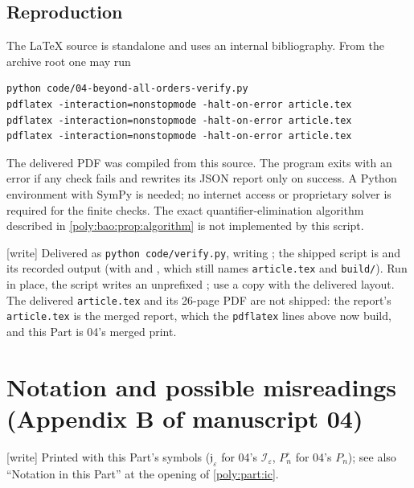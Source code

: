 \documentclass[11pt,a4paper]{article}
\numberwithin{equation}{section}
\theoremstyle{plain}
\newcommand{\wtag}{\textup{[write]}}%
\newcommand{\eps}{\varepsilon}
\newcommand{\JJ}{\mathfrak j}
\begin{document}
\subsection{Reproduction}
The LaTeX source is standalone and uses an internal bibliography. From
the archive root one may run
\begin{verbatim}
python code/04-beyond-all-orders-verify.py
pdflatex -interaction=nonstopmode -halt-on-error article.tex
pdflatex -interaction=nonstopmode -halt-on-error article.tex
pdflatex -interaction=nonstopmode -halt-on-error article.tex
\end{verbatim}
The delivered PDF was compiled from this source. The program exits with
an error if any check fails and rewrites its JSON report only on success.
A Python environment with SymPy is needed; no internet access or
proprietary solver is required for the finite checks. The exact
quantifier-elimination algorithm described in \cref{poly:bao:prop:algorithm} is
not implemented by this script.

\wtag{} Delivered as \texttt{python code/verify.py}, writing
; the shipped script is
 and its recorded output
 (with
 and
, which still names
\texttt{article.tex} and \texttt{build/}). Run in place, the script writes
an unprefixed ; use a copy with the
delivered layout. The delivered \texttt{article.tex} and its 26-page PDF
are not shipped: the report's \texttt{article.tex} is the merged report,
which the \texttt{pdflatex} lines above now build, and this Part is 04's
merged print.

\section{Notation and possible misreadings (Appendix B of manuscript 04)}
\wtag{} Printed with this Part's symbols ($\JJ_\eps$ for 04's
$\mathcal I_\eps$, $P^\circ_n$ for 04's $P_n$); see also ``Notation in this
Part'' at the opening of \cref{poly:part:ic}.
\end{document}
